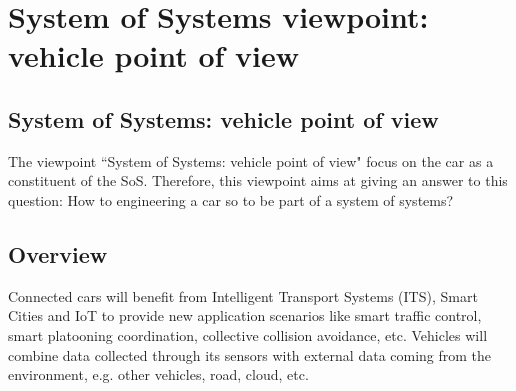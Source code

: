 \section{System of Systems viewpoint: vehicle point of view}\label{sec:SoSVP}
\renewcommand{\Fillin}[1]{{System of Systems: vehicle point of view}}
\subsection{\Fillin{Viewpoint Name}}\label{vp:template}

The viewpoint ``\Fillin{Viewpoint Name}" focus on the car as a constituent of the SoS. Therefore, this viewpoint aims at giving an
answer to this question: How to engineering a car so to be part of a system
of systems?



\subsection{Overview} 
Connected cars will benefit from Intelligent Transport Systems (ITS), Smart Cities and IoT to provide new application scenarios like smart traffic control,  smart platooning coordination, collective collision avoidance, etc. 
Vehicles will combine data collected through its sensors %
with external data coming from the environment, e.g. other vehicles, road, cloud, etc. %

